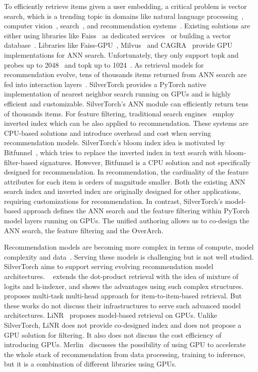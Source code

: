 To efficiently retrieve items given a user embedding, a critical problem is vector search, which is a trending topic in domains like natural language processing~\cite{lewis2020retrieval}, computer vision~\cite{zhai2019learning}, search~\cite{huang2020embedding}, and recommendation systems~\cite{zhao2023embedding}. Existing solutions are either using libraries like Faiss~\cite{douze2024faiss} as dedicated services~\cite{huang2020embedding} or building a vector database~\cite{pace2025lance, wang2021milvus}. Libraries like Faiss-GPU~\cite{johnson2019billion}, Milvus~\cite{wang2021milvus} and CAGRA~\cite{ootomo2024cagra} provide GPU implementations for ANN search. Unfortunately, they only support topk and probes up to 2048~\cite{FaissGPULimitation} and topk up to 1024~\cite{MilvusGPULimitation}. As retrieval models for recommendation evolve, tens of thousands items returned from ANN search are fed into interaction layers~\cite{ding2025retrieval}. SilverTorch provides a PyTorch native implementation of nearest neighbor search running on GPUs and is highly efficient and customizable. SilverTorch's ANN module can efficiently return tens of thousands items. For feature filtering, traditional search engines~\cite{brin1998anatomy, cambazoglu2016scalability, huang2020embedding} employ inverted index which can be also applied to recommendation. These systems are CPU-based solutions and introduce overhead and cost when serving recommendation models. SilverTorch's bloom index idea is motivated by Bitfunnel~\cite{goodwin2017bitfunnel}, which tries to replace the inverted index in text search with bloom-filter-based signatures. However, Bitfunnel is a CPU solution and not specifically designed for recommendation. In recommendation, the cardinality of the feature attributes for each item is orders of magnitude smaller. 
Both the existing ANN search index and inverted index are originally designed for other applications, requiring customizations for recommendation. 
In contrast, SilverTorch's model-based approach defines the ANN search and the feature filtering within PyTorch model layers running on GPUs. The unified authoring allows us to co-design the ANN search, the feature filtering and the OverArch.

Recommendation models are becoming more complex in terms of compute, model complexity and data~\cite{ardalani2022understanding, zhang2024wukong}. Serving these models is challenging but is not well studied. SilverTorch aims to support serving evolving recommendation model architectures. ~\cite{zhai2023revisiting} extends the dot-product retrieval with the idea of mixture of logits and h-indexer, and shows the advantages using such complex structures. ~\cite{zhang2025optimizing} proposes multi-task multi-head approach for item-to-item-based retrieval. But these works do not discuss their infrastructures to serve such advanced model architectures. LiNR~\cite{borisyuk2024linr} proposes model-based retrieval on GPUs. Unlike SilverTorch, LiNR does not provide co-designed index and does not propose a GPU solution for filtering. It also does not discuss the cost efficiency of introducing GPUs. Merlin~\cite{oldridge2020merlin} discusses the possibility of using GPU to accelerate the whole stack of recommendation from data processing, training to inference, but it is a combination of different libraries using GPUs.
